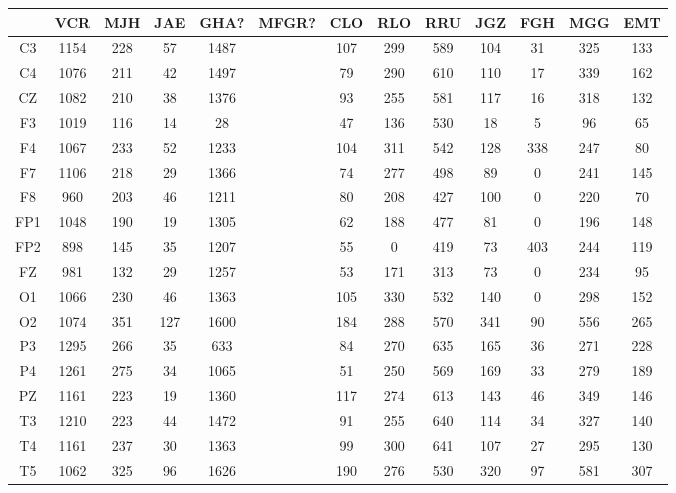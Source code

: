 
\begin{SidewaysFigure}
\centering
\begin{tabular}{c|ccccc|cccc|ccc}
& VCR & MJH & JAE & GHA? & MFGR?
& CLO & RLO & RRU & JGZ
& FGH & MGG & EMT \\
\hline
C3 &1154&228&57&1487&&107&299&589&104&31&325&133 \\
C4 &1076&211&42&1497&&79&290&610&110&17&339&162 \\
CZ &1082&210&38&1376&&93&255&581&117&16&318&132 \\
F3 &1019&116&14&28&&47&136&530&18&5&96&65 \\
F4 &1067&233&52&1233&&104&311&542&128&338&247&80 \\
F7 &1106&218&29&1366&&74&277&498&89&0&241&145 \\
F8 &960&203&46&1211&&80&208&427&100&0&220&70 \\
FP1 &1048&190&19&1305&&62&188&477&81&0&196&148 \\
FP2 &898&145&35&1207&&55&0&419&73&403&244&119 \\
FZ &981&132&29&1257&&53&171&313&73&0&234&95 \\
O1 &1066&230&46&1363&&105&330&532&140&0&298&152 \\
O2 &1074&351&127&1600&&184&288&570&341&90&556&265 \\
P3 &1295&266&35&633&&84&270&635&165&36&271&228 \\
P4 &1261&275&34&1065&&51&250&569&169&33&279&189 \\
PZ &1161&223&19&1360&&117&274&613&143&46&349&146 \\
T3 &1210&223&44&1472&&91&255&640&114&34&327&140 \\
T4 &1161&237&30&1363&&99&300&641&107&27&295&130 \\
T5 &1062&325&96&1626&&190&276&530&320&97&581&307 \\

\end{tabular}
\end{SidewaysFigure}
